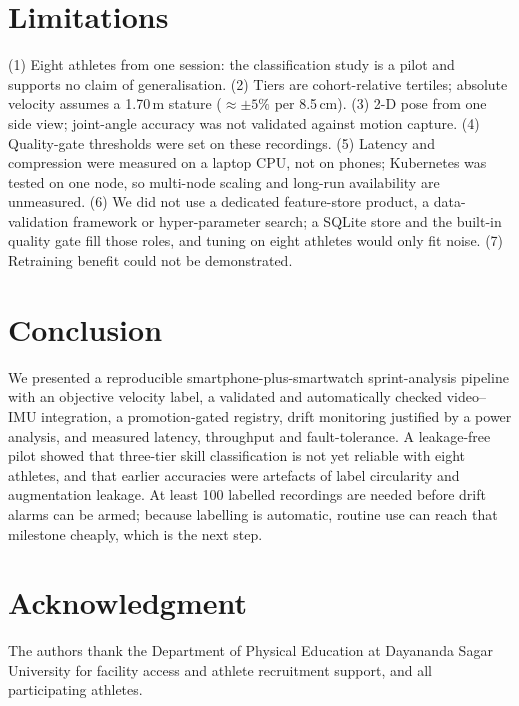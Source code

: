 \documentclass[conference]{IEEEtran}
\begin{document}
\section{Limitations}\label{sec:limits}
(1) Eight athletes from one session: the classification study is a pilot and supports no claim of generalisation. (2) Tiers are cohort-relative tertiles; absolute velocity assumes a 1.70\,m stature ($\approx\pm5\%$ per 8.5\,cm). (3) 2-D pose from one side view; joint-angle accuracy was not validated against motion capture. (4) Quality-gate thresholds were set on these recordings. (5) Latency and compression were measured on a laptop CPU, not on phones; Kubernetes was tested on one node, so multi-node scaling and long-run availability are unmeasured. (6) We did not use a dedicated feature-store product, a data-validation framework or hyper-parameter search; a SQLite store and the built-in quality gate fill those roles, and tuning on eight athletes would only fit noise. (7) Retraining benefit could not be demonstrated.

\section{Conclusion}
We presented a reproducible smartphone-plus-smartwatch sprint-analysis pipeline with an objective velocity label, a validated and automatically checked video--IMU integration, a promotion-gated registry, drift monitoring justified by a power analysis, and measured latency, throughput and fault-tolerance. A leakage-free pilot showed that three-tier skill classification is not yet reliable with eight athletes, and that earlier accuracies were artefacts of label circularity and augmentation leakage. At least 100 labelled recordings are needed before drift alarms can be armed; because labelling is automatic, routine use can reach that milestone cheaply, which is the next step.

\section*{Acknowledgment}
The authors thank the Department of Physical Education at Dayananda Sagar University for facility access and athlete recruitment support, and all participating athletes.
\end{document}
